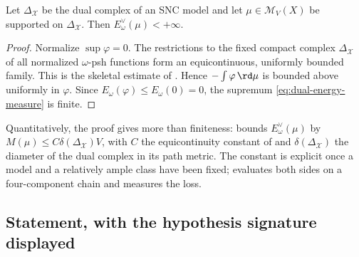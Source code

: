 \begin{lemma}
\label{lem:skeletal-measure-finite-energy}
Let \(\Delta_{\mathcal X}\) be the dual complex of an SNC model and let
\(\mu\in\mathcal M_V(X)\) be supported on \(\Delta_{\mathcal X}\).  Then
\(E_\omega^\vee(\mu)<+\infty\).
\end{lemma}

\begin{proof}
Normalize \(\sup\varphi=0\).  The restrictions to the fixed compact complex
\(\Delta_{\mathcal X}\) of all normalized \(\omega\)-psh functions form an
equicontinuous, uniformly bounded family.  This is the skeletal estimate of
.  Hence
\(-\int\varphi\,\rd \mu\) is bounded above uniformly in \(\varphi\).  Since
\(E_\omega(\varphi)\leq E_\omega(0)=0\), the supremum
\eqref{eq:dual-energy-measure} is finite.
\end{proof}

Quantitatively, the proof gives more than finiteness:
 bounds
\(E^\vee_\omega(\mu)\) by \(M(\mu)\leq C\delta(\Delta_{\mathcal X})V\), with
\(C\) the equicontinuity constant of
 and
\(\delta(\Delta_{\mathcal X})\) the diameter of the dual complex in its path
metric.  The constant is explicit once a model and a relatively ample class
have been fixed;  evaluates both sides on a
four-component chain and measures the loss.

\subsection{Statement, with the hypothesis signature displayed}
\label{sec:ch28-bfj-statement}

